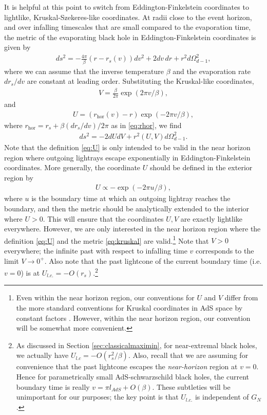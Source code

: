 \documentclass[11pt,a4paper]{article}
\begin{document}
It is helpful at this point to switch from Eddington-Finkelstein coordinates to lightlike, Kruskal-Szekeres-like coordinates. At radii close to the event horizon, and over infalling timescales that are small compared to the evaporation time, the metric of the evaporating black hole in Eddington-Finkelstein coordinates is given by
\begin{align}
ds^2 =  - \frac{4 \pi} {\beta}(r - r_s(v)) dv^2 + 2 dv\, dr + r^2 d\Omega_{d-1}^2,
\end{align}
where we can assume that the inverse temperature $\beta$ and the evaporation rate $d r_s/ dv$ are constant at leading order. Substituting the Kruskal-like coordinates,
\begin{align} \label{eq:V}
V = \frac{\beta}{2 \pi} \exp(2 \pi v /\beta),
\end{align}
and
\begin{align} \label{eq:U}
U = (r_\text{hor}(v) - r) \exp(- 2 \pi v / \beta),
\end{align}
where $r_\text{hor} = r_s + \beta (d r_s / d v) / 2 \pi$ as in \eqref{eq:rhor}, we find
\begin{align} \label{eq:kruskal}
ds^2  = -2 dU dV + r^2 (U, V) d\Omega_{d-1}^2.
\end{align}
Note that the definition \eqref{eq:U} is only intended to be valid in the near horizon region where outgoing lightrays escape exponentially in Eddington-Finkelstein coordinates. More generally, the coordinate $U$ should be defined in the exterior region by 
\begin{align}
U \propto - \exp(- 2 \pi u / \beta),
\end{align}
where $u$ is the boundary time at which an outgoing lightray reaches the boundary, and then the metric should be analytically extended to the interior where $U > 0$. This will ensure that the coordinates $U, V$ are exactly lightlike everywhere. However, we are only interested in the near horizon region where the definition \eqref{eq:U} and the metric \eqref{eq:kruskal} are valid.\footnote{Even within the near horizon region, our conventions for $U$ and $V$ differ from the more standard conventions for Kruskal coordinates in AdS space by constant factors \cite{harlow2016jerusalem}. However, within the near horizon region, our convention will be somewhat more convenient.} Note that $V>0$ everywhere; the infinite past with respect to infalling time $v$ corresponds to the limit $V \to 0^+$. Also note that the past lightcone of the current boundary time (i.e. $v = 0$) is at $U_{l.c.} = - O(r_s)$.\footnote{As discussed in Section \ref{sec:classicalmaximin}, for near-extremal black holes, we actually have $U_{l.c} = - O(r_s^2/ \beta)$. Also, recall that we are assuming for convenience that the past lightcone escapes the \emph{near-horizon} region at $v=0$. Hence for parametrically small AdS-schwarzschild black holes, the current boundary time is really $v = \pi l_{AdS} + O(\beta)$. These subtleties will be unimportant for our purposes; the key point is that $U_{l.c.}$ is independent of $G_N$.}
\end{document}
